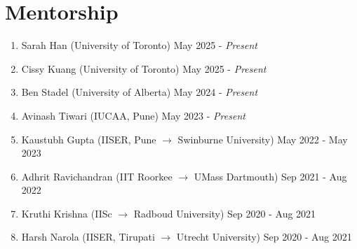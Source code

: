 	
		\section{Mentorship}
		\begin{enumerate}[leftmargin=*]
			\item Sarah Han (University of Toronto) \hfill May 2025 - \textit{Present}
			\item Cissy Kuang (University of Toronto) \hfill May 2025 - \textit{Present}
			\item Ben Stadel (University of Alberta) \hfill May 2024 - \textit{Present}
			\item Avinash Tiwari (IUCAA, Pune) \hfill May 2023 - \textit{Present}
			\item Kaustubh Gupta (IISER, Pune $\rightarrow$ Swinburne University) \hfill May 2022 - May 2023
			\item Adhrit Ravichandran (IIT Roorkee $\rightarrow$ UMass Dartmouth) \hfill Sep 2021 - Aug 2022
			\item Kruthi Krishna (IISc $ \rightarrow $ Radboud University) \hfill Sep 2020 - Aug 2021
			\item Harsh Narola (IISER, Tirupati $ \rightarrow $ Utrecht University) \hfill Sep 2020 - Aug 2021
		\end{enumerate}
		

